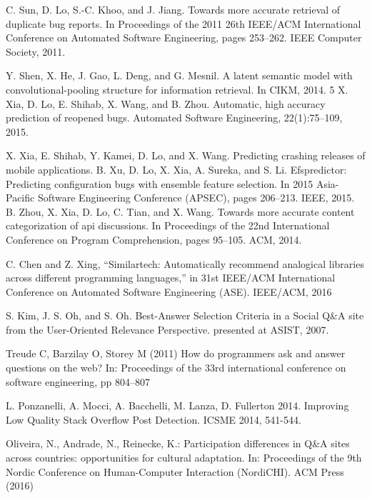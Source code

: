 \begin{thebibliography}{1}
C. Sun, D. Lo, S.-C. Khoo, and J. Jiang. Towards more accurate retrieval of duplicate bug reports. In Proceedings of the 2011 26th IEEE/ACM International Conference on Automated Software Engineering, pages 253–262. IEEE Computer Society, 2011.

   Y. Shen, X. He, J. Gao, L. Deng, and G. Mesnil. A latent semantic model with convolutional-pooling structure for information retrieval. In CIKM, 2014. 5 
 X. Xia, D. Lo, E. Shihab, X. Wang, and B. Zhou. Automatic, high accuracy prediction of reopened bugs. Automated Software Engineering, 22(1):75–109, 2015. 

  X. Xia, E. Shihab, Y. Kamei, D. Lo, and X. Wang. Predicting crashing releases of mobile applications. 
 B. Xu, D. Lo, X. Xia, A. Sureka, and S. Li. Efspredictor: Predicting configuration bugs with ensemble feature selection. In 2015 Asia-Pacific Software Engineering Conference (APSEC), pages 206–213. IEEE, 2015.
B. Zhou, X. Xia, D. Lo, C. Tian, and X. Wang. Towards more accurate content categorization of api discussions. In Proceedings of the 22nd International Conference on Program Comprehension, pages 95–105. ACM, 2014.

 C. Chen and Z. Xing, “Similartech: Automatically recommend analogical libraries across different programming languages,” in 31st IEEE/ACM International Conference on Automated Software Engineering (ASE). IEEE/ACM, 2016

S. Kim, J. S. Oh, and S. Oh. Best-Answer Selection Criteria in a Social Q\&A site from the User-Oriented Relevance Perspective. presented at ASIST, 2007.

Treude C, Barzilay O, Storey M (2011) How do programmers ask and answer questions on the web? In: Proceedings of the 33rd international conference on software engineering, pp 804–807

L. Ponzanelli, A. Mocci, A. Bacchelli, M. Lanza, D. Fullerton 2014. Improving Low Quality Stack Overflow Post Detection. ICSME 2014, 541-544. 

Oliveira, N., Andrade, N., Reinecke, K.: Participation differences in Q\&A sites across countries: opportunities for cultural adaptation. In: Proceedings of the 9th Nordic Conference on Human-Computer Interaction (NordiCHI). ACM Press (2016)


\end{thebibliography}
